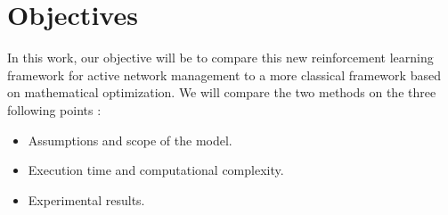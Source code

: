\section{Objectives}
\label{sec:objective}

In this work, our objective will be to compare this new reinforcement learning framework for active network management to a more classical framework based on mathematical optimization.
We will compare the two methods on the three following points :
\begin{itemize}
\item Assumptions and scope of the model.
\item Execution time and computational complexity.
\item Experimental results.
\end{itemize}
